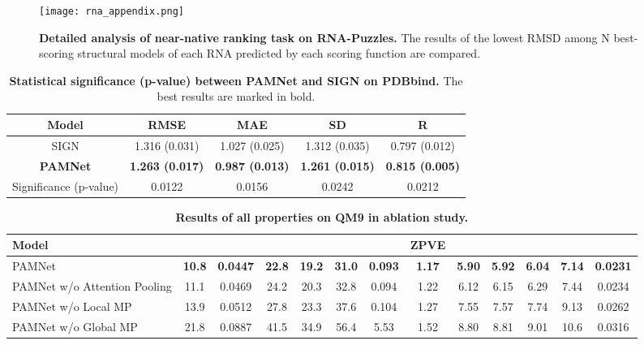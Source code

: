 \documentclass[fleqn,10pt]{wlscirep}
\newcommand{\method}{PAMNet\xspace}
\begin{document}
\begin{figure*}[ht]
    \centering
    \texttt{[image: rna\_appendix.png]}
    \caption{\textbf{Detailed analysis of near-native ranking task on RNA-Puzzles.} The results of the lowest RMSD among N best-scoring structural models of each RNA predicted by each scoring function are compared.}
\label{fig:rna_appendix}
\end{figure*}


\begin{table}[ht]
\centering
\begin{tabular}{ccccc}
    \toprule
    Model & RMSE  & MAE  & SD  & R  \\
    \midrule
    SIGN & 1.316 (0.031) & 1.027 (0.025) & 1.312 (0.035) & 0.797 (0.012)\\
    \textbf{\method} & \textbf{1.263 (0.017)} & \textbf{0.987 (0.013)} & \textbf{1.261 (0.015)} & \textbf{0.815 (0.005)}\\
    \midrule
    Significance (p-value) & 0.0122 & 0.0156 & 0.0242 & 0.0212\\
    \bottomrule
\end{tabular}
\caption{\textbf{Statistical significance (p-value) between \method and SIGN on PDBbind.} The best results are marked in bold.}
\label{table:significance}
\end{table}



\begin{table}[ht]
\small
\centering
\begin{tabular}{lcccccccccccc}
\toprule
     Model &  &  &  &  &  &  & ZPVE &  &  &  &  &  \\
     \midrule
     PAMNet & \textbf{10.8} & \textbf{0.0447} & \textbf{22.8} & \textbf{19.2} & \textbf{31.0} & \textbf{0.093} & \textbf{1.17} & \textbf{5.90} & \textbf{5.92} & \textbf{6.04} & \textbf{7.14} & \textbf{0.0231} \\
     PAMNet w/o Attention Pooling & 11.1 & 0.0469 & 24.2 & 20.3 & 32.8 & 0.094 & 1.22 & 6.12 & 6.15 & 6.29 & 7.44 & 0.0234 \\
     PAMNet w/o Local MP & 13.9 & 0.0512 & 27.8 & 23.3 & 37.6 & 0.104 & 1.27 & 7.55 & 7.57 & 7.74 & 9.13 & 0.0262 \\
     PAMNet w/o Global MP & 21.8 & 0.0887 & 41.5 & 34.9 & 56.4 & 5.53 & 1.52 & 8.80 & 8.81 & 9.01 & 10.6 & 0.0316 \\
\bottomrule
\end{tabular}
\caption{\textbf{Results of all properties on QM9 in ablation study.}}
\label{table:ablation_qm9}
\end{table}
\end{document}
